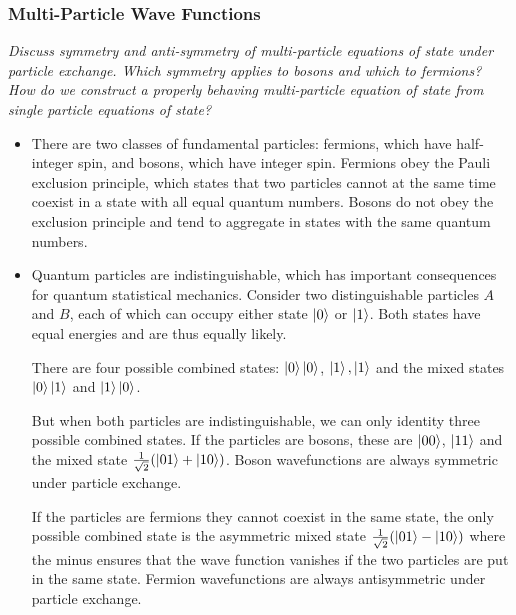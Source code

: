\documentclass[11pt, a4paper]{article}
\begin{document}
\subsubsection{Multi-Particle Wave Functions}
\textit{Discuss symmetry and anti-symmetry of multi-particle equations of state under particle exchange. Which symmetry applies to bosons and which to fermions? How do we construct a properly behaving multi-particle equation of state from single particle equations of state?}

\begin{itemize}

	\iffalse
	\item Consider a system of $ N $ independent quantum particles with wave functions $ \psi_{1}(\bm{q}_{1}), \ldots,  \psi_{N}(\bm{q}_{N}) $. Because the particles are independent, the wave function for the entire system can be written as the product
	\begin{equation*}
		\psi(\bm{q}_{1}, \ldots, \bm{q}_{N}) = \psi_{1}(\bm{q}_{1}) \cdot \psi_{2}(\bm{q}_{2}) \cdot \cdots  \cdot \psi_{N}(\bm{q}_{N})
	\end{equation*}
	\fi
	\item There are two classes of fundamental particles: fermions, which have half-integer spin, and bosons, which have integer spin. Fermions obey the Pauli exclusion principle, which states that two particles cannot at the same time coexist in a state with all equal quantum numbers. Bosons do not obey the exclusion principle and tend to aggregate in states with the same quantum numbers.
	
	\item Quantum particles are indistinguishable, which has important consequences for quantum statistical mechanics. Consider two distinguishable particles $ A $ and $ B $, each of which can occupy either state $ \ket{0} $ or $ \ket{1} $. Both states have equal energies and are thus equally likely.
	
	There are four possible combined states: $ \ket{0} \ket{0} $, $ \ket{1}, \ket{1} $ and the mixed states $ \ket{0}\ket{1} $ and $ \ket{1}\ket{0} $.  
	
	But when both particles are indistinguishable, we can only identity three possible combined states. If the particles are bosons, these are $  \ket{00} $, $ \ket{11} $ and the mixed state $ \frac{1}{\sqrt{2}}(\ket{01} + \ket{10}) $. Boson wavefunctions are always symmetric under particle exchange.
	
	If the particles are fermions they cannot coexist in the same state, the only possible combined state
	is the asymmetric mixed state $ \frac{1}{\sqrt{2}}(\ket{01} - \ket{10}) $ where the minus ensures that the wave function vanishes if the two particles are put in the same state. Fermion wavefunctions are always antisymmetric under particle exchange.
	

\end{itemize}
\end{document}
